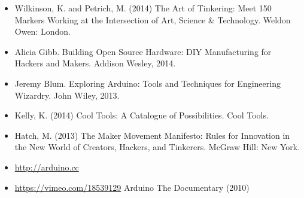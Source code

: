 \documentclass{../fal_assignment}
\begin{document}
\begin{itemize}
    \item Wilkinson, K. and Petrich, M. (2014) The Art of Tinkering: Meet 150 Markers Working at the Intersection of Art, Science \& Technology. Weldon Owen: London.
    \item Alicia Gibb. Building Open Source Hardware: DIY Manufacturing for Hackers and Makers. Addison Wesley, 2014. 
    \item Jeremy Blum. Exploring Arduino: Tools and Techniques for Engineering Wizardry. John Wiley, 2013. 
    \item Kelly, K. (2014) Cool Tools: A Catalogue of Possibilities. Cool Tools.
    \item Hatch, M. (2013) The Maker Movement Manifesto: Rules for Innovation in the New World of Creators, Hackers, and Tinkerers. McGraw Hill: New York.
    \item \url{http://arduino.cc}
    \item \url{https://vimeo.com/18539129} Arduino The Documentary (2010)
\end{itemize}
\end{document}

